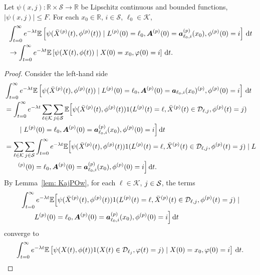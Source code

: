 \begin{cor}\label{cor: lk}
	Let \(\psi(x,j):\mathbb R\times \mathcal S \to \mathbb R\) be Lipschitz continuous and bounded functions, \(|\psi(x,j)|\leq F\). For each \(x_0\in\mathbb R\), \(i\in\mathcal S\), \(\ell_0\in\mathcal K\), 
	\begin{align}
		&\int_{t=0}^\infty e^{-\lambda t}\mathbb E\left[\psi(\bar X^{(p)}(t),\phi^{(p)}(t))  \mid L^{(p)}(0)=\ell_0, \boldsymbol A^{(p)}(0)=\boldsymbol  a_{\ell_0,i}^{(p)}(x_0), \phi^{(p)}(0)=i \right] \, \mathrm{d} t \nonumber
		\\&\to \int_{t=0}^\infty e^{-\lambda t}  \mathbb E\left[\psi(X(t),\phi(t))\mid X(0)=x_0, \varphi(0)=i \right] \, \mathrm{d} t.\nonumber
	\end{align}
\end{cor}
\begin{proof}
	Consider the left-hand side 
	\begin{align}
		&\int_{t=0}^\infty e^{-\lambda t}\mathbb E\left[\psi(\bar X^{(p)}(t),\phi^{(p)}(t))  \mid L^{(p)}(0)=\ell_0, \boldsymbol A^{(p)}(0)=\boldsymbol  a_{\ell_0,i}(x_0)^{(p)}, \phi^{(p)}(0)=i \right] \, \mathrm{d} t \nonumber 
		\\&= \int_{t=0}^\infty e^{-\lambda t}\sum_{\ell\in\mathcal K}\sum_{j\in\mathcal S}\mathbb E\Big[\psi(\bar X^{(p)}(t),\phi^{(p)}(t)) 1(L^{(p)}(t)=\ell, \bar X^{(p)}(t) \in \mathcal D_{\ell,j},\phi^{(p)}(t)=j) \nonumber 
		\\&\qquad{} \mid L^{(p)}(0)=\ell_0,  \boldsymbol A^{(p)}(0)=\boldsymbol  a_{\ell_0,i}^{(p)}(x_0), \phi^{(p)}(0)=i \Big] \, \mathrm{d} t \nonumber 
		\\&= \sum_{\ell\in\mathcal K}\sum_{j\in\mathcal S}\int_{t=0}^\infty e^{-\lambda t}\mathbb E\Big[\psi(\bar X^{(p)}(t),\phi^{(p)}(t)) 1(L^{(p)}(t)=\ell, \bar X^{(p)}(t) \in \mathcal D_{\ell,j},\phi^{(p)}(t)=j)  \mid L\nonumber 
		\\&\qquad{} ^{(p)}(0)=\ell_0, \boldsymbol A^{(p)}(0)=\boldsymbol  a_{\ell_0,i}^{(p)}(x_0), \phi^{(p)}(0)=i \Big] \, \mathrm{d} t. \label{eqnL AKJF cjk ajhJK}
	\end{align}
	By Lemma~\ref{lem: KajPOw}, for each \(\ell\in\mathcal K\), \(j\in\mathcal{S}\), the terms 
	 \begin{align}
	 	&\int_{t=0}^\infty e^{-\lambda t}\mathbb E\Big[\psi(\bar X^{(p)}(t),\phi^{(p)}(t)) 1(L^{(p)}(t)=\ell, \bar X^{(p)}(t) \in \mathcal D_{\ell,j},\phi^{(p)}(t)=j)  \mid \nonumber 
		\\&\qquad{}L^{(p)}(0)=\ell_0,  \boldsymbol A^{(p)}(0)=\boldsymbol  a_{\ell_0,i}^{(p)}(x_0), \phi^{(p)}(0)=i \Big] \, \mathrm{d} t
	\end{align}
		converge to 
	\[\int_{t=0}^\infty e^{-\lambda t}  \mathbb E\left[\psi(X(t),\phi(t))1(X(t)\in\mathcal D_{\ell_j},\varphi(t)=j)\mid X(0)=x_0, \varphi(0)=i \right] \, \mathrm{d} t.\]
	

\end{proof}
